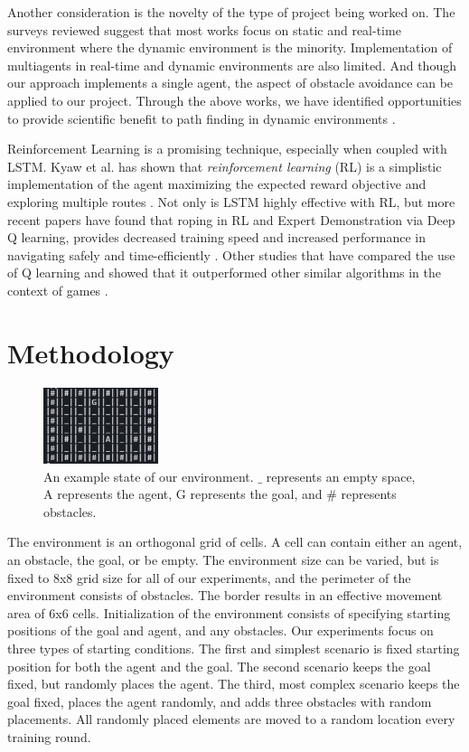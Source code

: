 \documentclass[conference]{IEEEtran}
\begin{document}
Another consideration is the novelty of the type of project being worked on. The
surveys reviewed suggest that most works focus on static and real-time
environment where the dynamic environment is the minority.  Implementation of
multiagents in real-time and dynamic environments are also limited.  And though
our approach implements a single agent, the aspect of obstacle avoidance can be
applied to our project. Through the above works, we have identified
opportunities to provide scientific benefit to path finding in dynamic
environments \cite{abd_algfoor_comprehensive_2015}.

Reinforcement Learning is a promising technique, especially when coupled with
LSTM. Kyaw et al. has shown that \textit{reinforcement learning} (RL) is a
simplistic implementation of the agent maximizing the expected reward objective
and exploring multiple routes \cite{kyaw_coverage_2020}. Not only is LSTM highly
effective with RL, but more recent papers have found that roping in RL and
Expert Demonstration via Deep Q learning, provides decreased training speed and
increased performance in navigating safely and time-efficiently
\cite{liu_improved_2021}.  Other studies that have compared the use of Q
learning and showed that it outperformed other similar algorithms in the context
of games \cite{hester_deep_2017}.

\section{Methodology}

\begin{figure}
    \centering
    \includegraphics[width=0.3\textwidth]{assets/environment.png}
    \caption{An example state of our environment. $\_$ represents an empty
        space, A represents the agent, G represents the goal, and $\#$
        represents obstacles.}
    \label{fig:path_planning_methodology}
\end{figure}

The environment is an orthogonal grid of cells. A cell can contain either an
agent, an obstacle, the goal, or be empty. The environment size can be varied,
but is fixed to 8x8 grid size for all of our experiments, and the perimeter of
the environment consists of obstacles. The border results in an effective
movement area of 6x6 cells. Initialization of the environment consists of
specifying starting positions of the goal and agent, and any obstacles. Our
experiments focus on three types of starting conditions. The first and simplest
scenario is fixed starting position for both the agent and the goal. The second
scenario keeps the goal fixed, but randomly places the agent. The third, most
complex scenario keeps the goal fixed, places the agent randomly, and adds three
obstacles with random placements. All randomly placed elements are moved to a
random location every training round.
\end{document}
